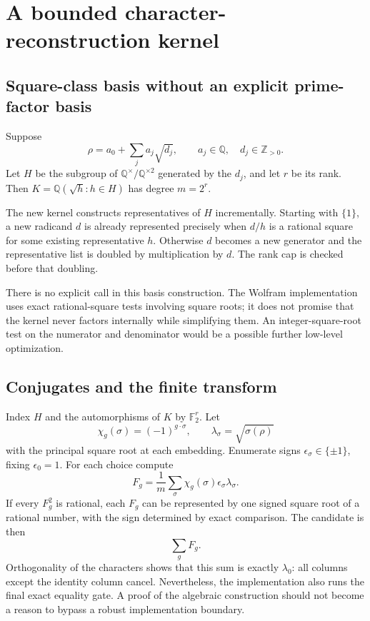 \documentclass[11pt,a4paper]{article}
\newcommand{\Q}{\mathbb Q}\newcommand{\C}{\mathbb C}
\newcommand{\code}[1]{\texttt{\detokenize{#1}}}
\theoremstyle{definition}\newtheorem{definition}[proposition]{Definition}
\theoremstyle{remark}\newtheorem{remark}[proposition]{Remark}
\begin{document}
\section{A bounded character-reconstruction kernel}

\subsection{Square-class basis without an explicit prime-factor basis}
Suppose
\begin{equation}
 \rho=a_0+\sum_j a_j\sqrt{d_j},\qquad a_j\in\Q,\quad d_j\in\mathbb Z_{>0}.
\end{equation}
Let $H$ be the subgroup of $\Q^\times/\Q^{\times2}$ generated by the $d_j$,
and let $r$ be its rank. Then $K=\Q(\sqrt h:h\in H)$ has degree $m=2^r$.

The new kernel constructs representatives of $H$ incrementally. Starting with
$\{1\}$, a new radicand $d$ is already represented precisely when $d/h$ is a
rational square for some existing representative $h$. Otherwise $d$ becomes a
new generator and the representative list is doubled by multiplication by $d$.
The rank cap is checked before that doubling.

There is no explicit \code{FactorInteger} call in this basis construction.
The Wolfram implementation uses exact rational-square tests involving square
roots; it does not promise that the kernel never factors internally while
simplifying them. An integer-square-root test on the numerator and denominator
would be a possible further low-level optimization.

\subsection{Conjugates and the finite transform}
Index $H$ and the automorphisms of $K$ by $\mathbb F_2^r$. Let
\begin{equation}
 \chi_g(\sigma)=(-1)^{g\cdot\sigma},\qquad
 \lambda_\sigma=\sqrt{\sigma(\rho)}
\end{equation}
with the principal square root at each embedding. Enumerate signs
$\epsilon_\sigma\in\{\pm1\}$, fixing $\epsilon_0=1$. For each choice compute
\begin{equation}\label{eq:fourier}
 F_g=\frac1m\sum_\sigma\chi_g(\sigma)\epsilon_\sigma\lambda_\sigma.
\end{equation}
If every $F_g^2$ is rational, each $F_g$ can be represented by one signed square
root of a rational number, with the sign determined by exact comparison. The
candidate is then
\begin{equation}\label{eq:reconstruct}
 \sum_g F_g.
\end{equation}
Orthogonality of the characters shows that this sum is exactly $\lambda_0$:
all columns except the identity column cancel. Nevertheless, the implementation
also runs the final exact equality gate. A proof of the algebraic construction
should not become a reason to bypass a robust implementation boundary.
\end{document}
